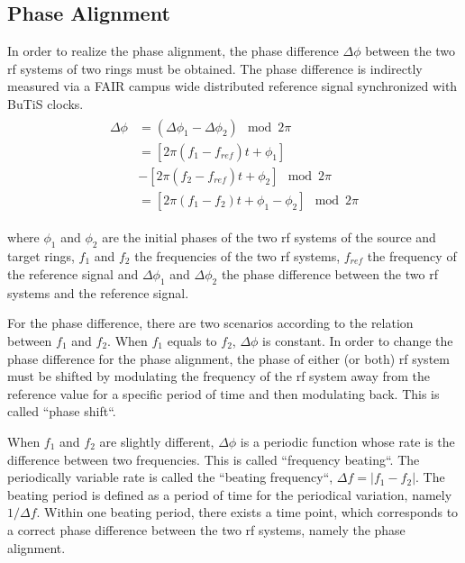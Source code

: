 \subsection{Phase Alignment}
In order to realize the phase alignment, the phase difference $\Delta \phi$ between the two rf systems of two rings must be obtained. The phase difference is indirectly measured via a FAIR campus wide distributed reference signal synchronized with BuTiS clocks. 
\begin{eqnarray}
\begin{aligned}
	\Delta \phi&=(\Delta \phi_1-\Delta \phi_2) \mod 2\pi\\
&=[2\pi(f_1-f_\mathit{ref})t+\phi_1]\\
&-[2\pi(f_2-f_\mathit{ref})t+\phi_2] \mod 2\pi \\
&=[2\pi(f_1-f_2)t+\phi_1-\phi_2] \mod 2\pi
\end{aligned}
\end{eqnarray}

where $\phi_1$ and $\phi_2$ are the initial phases of the two rf systems of the source and target rings, $f_1$ and $f_2$ the frequencies of the two rf systems, $f_\mathit{ref}$ the frequency of the reference signal and $\Delta \phi_1$ and $\Delta \phi_2$ the phase difference between the two rf systems and the reference signal. 

For the phase difference, there are two scenarios according to the relation between $f_1$ and $f_2$. When $f_1$ equals to $f_2$, $\Delta \phi$ is constant. In order to change the phase difference for the phase alignment, the phase of either (or both) rf system must be shifted by modulating the frequency of the rf system away from the reference value for a specific period of time and then modulating back. This is called ``phase shift``.

When $f_1$ and $f_2$ are slightly different, $\Delta \phi$ is a periodic function whose rate is the difference between two frequencies. This is called ``frequency beating``. The periodically variable rate is called the ``beating frequency``, $\Delta f=|f_1-f_2|$. The beating period is defined as a period of time for the periodical variation, namely $1/\Delta f$. Within one beating period, there exists a time point, which corresponds to a correct phase difference between the two rf systems, namely the phase alignment. 

